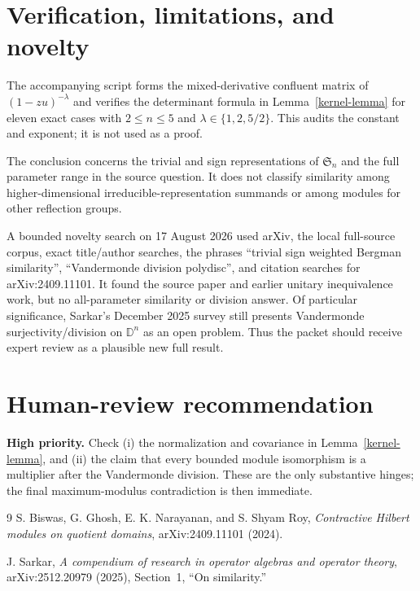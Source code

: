 \documentclass[11pt]{article}
\newcommand{\D}{\mathbb D}
\newcommand{\Sn}{\mathfrak S_n}
\begin{document}
\section{Verification, limitations, and novelty}

The accompanying script forms the mixed-derivative confluent matrix of
$(1-zu)^{-\lambda}$ and verifies the determinant formula in
Lemma~\ref{kernel-lemma} for eleven exact cases with $2\leq n\leq5$ and
$\lambda\in\{1,2,5/2\}$.  This audits the constant and exponent; it is not
used as a proof.

The conclusion concerns the trivial and sign representations of $\Sn$ and
the full parameter range in the source question.  It does not classify
similarity among higher-dimensional irreducible-representation summands or
among modules for other reflection groups.

A bounded novelty search on 17 August 2026 used arXiv, the local full-source
corpus, exact title/author searches, the phrases ``trivial sign weighted
Bergman similarity'', ``Vandermonde division polydisc'', and citation searches
for arXiv:2409.11101.  It found the source paper and earlier unitary
inequivalence work, but no all-parameter similarity or division answer.  Of
particular significance, Sarkar's December 2025 survey
\cite{survey} still presents Vandermonde surjectivity/division on $\D^n$ as
an open problem.  Thus the packet should receive expert review as a plausible
new full result.

\section*{Human-review recommendation}

\textbf{High priority.}  Check (i) the normalization and covariance in
Lemma~\ref{kernel-lemma}, and (ii) the claim that every bounded module
isomorphism is a multiplier after the Vandermonde division.  These are the
only substantive hinges; the final maximum-modulus contradiction is then
immediate.

\small
\begin{thebibliography}{9}
S. Biswas, G. Ghosh, E. K. Narayanan, and S. Shyam Roy,
\emph{Contractive Hilbert modules on quotient domains},
arXiv:2409.11101 (2024).

J. Sarkar,
\emph{A compendium of research in operator algebras and operator theory},
arXiv:2512.20979 (2025), Section~1, ``On similarity.''
\end{thebibliography}
\end{document}
